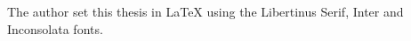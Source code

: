 \begin{titlepage}
\medskip
\medskip
\noindent The author set this thesis in \LaTeX\xspace using the Libertinus Serif, Inter and Inconsolata fonts.

\vspace{\bigskipamount}




\medskip

\end{titlepage}

